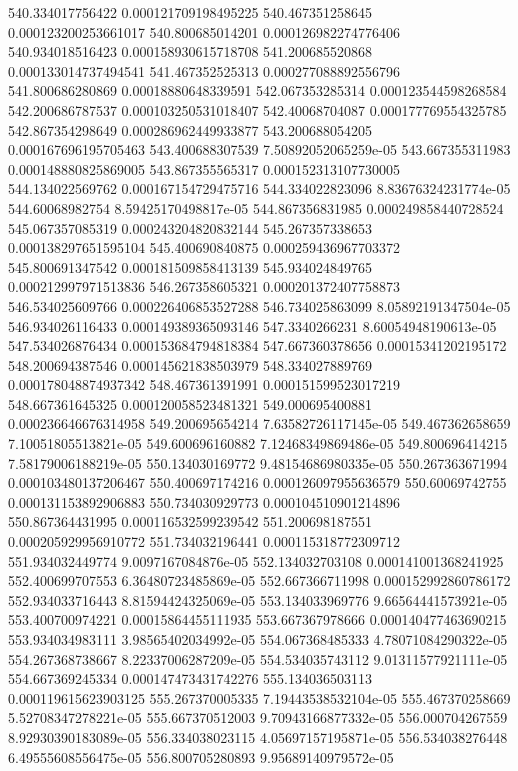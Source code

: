 {540.334017756422 0.000121709198495225
540.467351258645 0.000123200253661017
540.800685014201 0.000126982274776406
540.934018516423 0.000158930615718708
541.200685520868 0.000133014737494541
541.467352525313 0.000277088892556796
541.800686280869 0.00018880648339591
542.067353285314 0.000123544598268584
542.200686787537 0.000103250531018407
542.40068704087 0.000177769554325785
542.867354298649 0.000286962449933877
543.200688054205 0.000167696195705463
543.400688307539 7.50892052065259e-05
543.667355311983 0.000148880825869005
543.867355565317 0.000152313107730005
544.134022569762 0.000167154729475716
544.334022823096 8.83676324231774e-05
544.60068982754 8.59425170498817e-05
544.867356831985 0.000249858440728524
545.067357085319 0.000243204820832144
545.267357338653 0.000138297651595104
545.400690840875 0.000259436967703372
545.800691347542 0.000181509858413139
545.934024849765 0.000212997971513836
546.267358605321 0.000201372407758873
546.534025609766 0.000226406853527288
546.734025863099 8.05892191347504e-05
546.934026116433 0.000149389365093146
547.3340266231 8.60054948190613e-05
547.534026876434 0.000153684794818384
547.667360378656 0.00015341202195172
548.200694387546 0.000145621838503979
548.334027889769 0.000178048874937342
548.467361391991 0.000151599523017219
548.667361645325 0.000120058523481321
549.000695400881 0.000236646676314958
549.200695654214 7.63582726117145e-05
549.467362658659 7.10051805513821e-05
549.600696160882 7.12468349869486e-05
549.800696414215 7.58179006188219e-05
550.134030169772 9.48154686980335e-05
550.267363671994 0.000103480137206467
550.400697174216 0.000126097955636579
550.60069742755 0.000131153892906883
550.734030929773 0.000104510901214896
550.867364431995 0.000116532599239542
551.200698187551 0.000205929956910772
551.734032196441 0.000115318772309712
551.934032449774 9.0097167084876e-05
552.134032703108 0.000141001368241925
552.400699707553 6.36480723485869e-05
552.667366711998 0.000152992860786172
552.934033716443 8.81594424325069e-05
553.134033969776 9.66564441573921e-05
553.400700974221 0.00015864455111935
553.667367978666 0.000140477463690215
553.934034983111 3.98565402034992e-05
554.067368485333 4.78071084290322e-05
554.267368738667 8.22337006287209e-05
554.534035743112 9.01311577921111e-05
554.667369245334 0.000147473431742276
555.134036503113 0.000119615623903125
555.267370005335 7.19443538532104e-05
555.467370258669 5.52708347278221e-05
555.667370512003 9.70943166877332e-05
556.000704267559 8.92930390183089e-05
556.334038023115 4.05697157195871e-05
556.534038276448 6.49555608556475e-05
556.800705280893 9.95689140979572e-05
}
